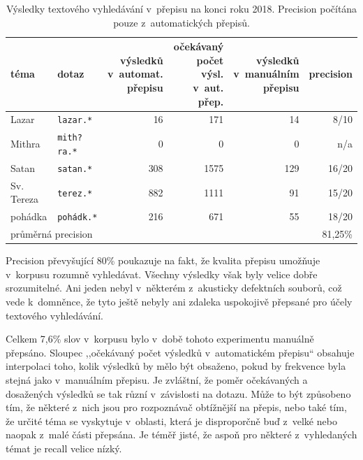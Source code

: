 \begin{table}[htpb]
\begin{center}
\begin{tabular}{|l|l|r|r|r|r|}
\hline
téma &
dotaz &
\makecell{výsledků\\ v~automat.\\ přepisu} &
\makecell{očekávaný\\ počet výsl.\\ v~aut. přep.} &
\makecell{výsledků\\ v~manuálním\\ přepisu} &
precision \\
\hline
Lazar & \texttt{lazar.*} & 16 & 171 & 14 & 8/10   \\
Mithra & \texttt{mith?ra.*} & 0 & 0 & 0 & n/a   \\
Satan & \texttt{satan.*} & 308 & 1575 & 129 & 16/20   \\
Sv. Tereza & \texttt{terez.*} & 882 & 1111 & 91 & 15/20   \\
pohádka & \texttt{pohádk.*} & 216 & 671 & 55 & 18/20   \\
\hline
\multicolumn{5}{|l|}{průměrná precision} & 81,25\%\\
\hline
\end{tabular}
\caption{Výsledky textového vyhledávání v~přepisu na konci roku 2018. Precision počítána pouze
z~automatických přepisů.}\label{tab:topicsearch}
\end{center}
\end{table}


Precision převyšující 80\% poukazuje na fakt, že
kvalita přepisu umožňuje v~korpusu rozumně vyhledávat. Všechny výsledky však
byly velice dobře srozumitelné. Ani jeden nebyl v~některém z~akusticky
defektních souborů, což vede k~domněnce, že tyto ještě nebyly ani zdaleka
uspokojivě přepsané pro účely textového vyhledávání.

Celkem 7,6\% slov v~korpusu bylo v~době tohoto experimentu manuálně přepsáno. Sloupec ,,očekávaný počet
výsledků v~automatickém přepisu`` obsahuje interpolaci toho, kolik výsledků by
mělo být obsaženo, pokud by frekvence byla stejná jako v~manuálním přepisu. Je
zvláštní, že poměr očekávaných a dosažených výsledků se tak různí v~závislosti
na dotazu. Může to být způsobeno tím, že některé z~nich jsou pro rozpoznávač
obtížnější na přepis, nebo také tím, že určité téma se vyskytuje v~oblasti,
která je disproporčně buď z~velké nebo naopak z~malé části přepsána. Je téměř
jisté, že aspoň pro některé z~vyhledaných témat je recall velice nízký.

